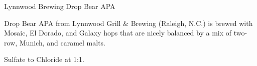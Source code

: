 \begin{recipie}{Lynnwood Brewing Drop Bear APA}

\begin{aboutblock}
Drop Bear APA from Lynnwood Grill \& Brewing (Raleigh, N.C.) is brewed with Mosaic,
El Dorado, and Galaxy hops that are nicely balanced by a mix of two-row, Munich,
and caramel malts.
\end{aboutblock}


\begin{methodandtiming}
 
\begin{mashsteps}
\end{mashsteps}

\begin{fermentationsteps}
\end{fermentationsteps}

\begin{directions}
Sulfate to Chloride at 1:1.
\end{directions}

\end{methodandtiming}

\pagebreak

\begin{ingredientsblock}

\begin{malts}
\end{malts}

\begin{hops}
\end{hops}

\begin{yeasts}
\end{yeasts}

\end{ingredientsblock}

\end{recipie}

